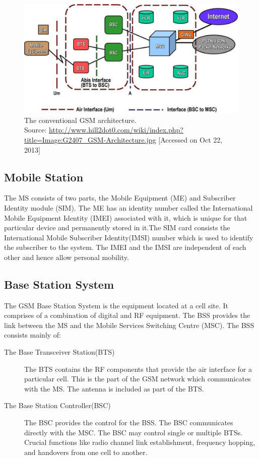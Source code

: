\begin{figure}[h]
\centering
\includegraphics[width=1\textwidth]{gsmArch}
\caption[The conventional GSM architecture]{The conventional GSM architecture.\\
\footnotesize{Source:
\url{http://www.hill2dot0.com/wiki/index.php?title=Image:G2407\_GSM-Architecture.jpg} 
[Accessed on Oct 22, 2013]}}
\label{gsmArch}
\end{figure}

\subsection{Mobile Station}
The MS consists of two parts, the Mobile Equipment (ME) and Subscriber
Identity module (SIM). The ME has an identity number called the International
 Mobile Equipment Identity (IMEI) associated with it, which is unique for
that particular device and permanently stored in it.The SIM card consists
the International Mobile Subscriber Identity(IMSI) number which is used
to identify the subscriber to the system. The IMEI and the IMSI are independent
of each other and hence allow personal mobility.

\subsection{Base Station System}
The GSM Base Station System is the equipment located at a cell site. It
comprises of a combination of digital and RF equipment. The BSS provides
the link between the MS and the Mobile Services Switching Centre (MSC).
The BSS consists mainly of:
\begin{description}
\item[The Base Transceiver Station(BTS)]
The BTS contains the RF components that provide the air interface for
 a particular cell. This is the part of the GSM network which communicates
 with the MS. The antenna is included as part of the BTS.
\item[The Base Station Controller(BSC)]
The BSC provides the control for the BSS. The BSC communicates directly
with the MSC. The BSC may control single or multiple BTSs. Crucial functions
like radio channel link establishment, frequency hopping, and handovers from
one cell to another.

\end{description}

